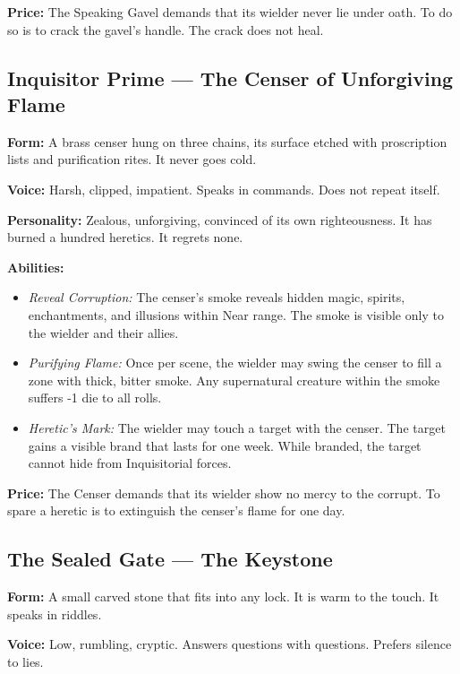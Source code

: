 \noindent\textbf{Price:} The Speaking Gavel demands that its wielder never lie under oath. To do so is to crack the gavel's handle. The crack does not heal.

\subsection{Inquisitor Prime — The Censer of Unforgiving Flame}

\noindent\textbf{Form:} A brass censer hung on three chains, its surface etched with proscription lists and purification rites. It never goes cold.

\noindent\textbf{Voice:} Harsh, clipped, impatient. Speaks in commands. Does not repeat itself.

\noindent\textbf{Personality:} Zealous, unforgiving, convinced of its own righteousness. It has burned a hundred heretics. It regrets none.

\noindent\textbf{Abilities:}
\begin{itemize}
\item \textit{Reveal Corruption:} The censer's smoke reveals hidden magic, spirits, enchantments, and illusions within Near range. The smoke is visible only to the wielder and their allies.
\item \textit{Purifying Flame:} Once per scene, the wielder may swing the censer to fill a zone with thick, bitter smoke. Any supernatural creature within the smoke suffers -1 die to all rolls.
\item \textit{Heretic's Mark:} The wielder may touch a target with the censer. The target gains a visible brand that lasts for one week. While branded, the target cannot hide from Inquisitorial forces.
\end{itemize}

\noindent\textbf{Price:} The Censer demands that its wielder show no mercy to the corrupt. To spare a heretic is to extinguish the censer's flame for one day.

\subsection{The Sealed Gate — The Keystone}

\noindent\textbf{Form:} A small carved stone that fits into any lock. It is warm to the touch. It speaks in riddles.

\noindent\textbf{Voice:} Low, rumbling, cryptic. Answers questions with questions. Prefers silence to lies.

